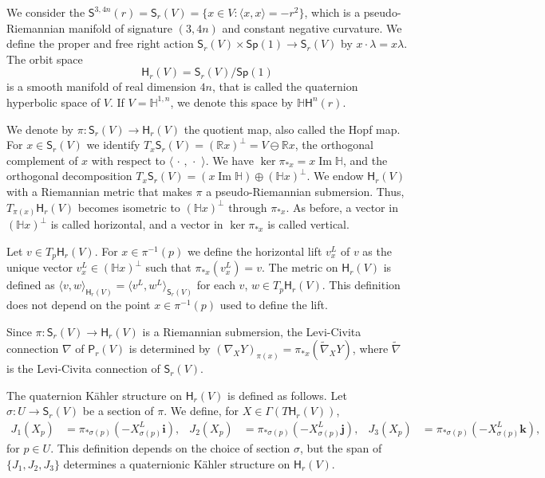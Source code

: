 \documentclass[12pt, a4paper]{amsart}
\newcommand{\R}{\mathbb{R}}
\renewcommand{\H}{\mathbb{H}}
\renewcommand{\Im}{\operatorname{Im}}
\newcommand{\Sp}{\mathsf{Sp}}
\theoremstyle{remark}
\begin{document}
We consider the $\mathsf{S}^{3,4n}(r)=\mathsf{S}_r(V)=\{{x}\in V:\langle {x},{x}\rangle=-r^2\}$,
which is a pseudo-Riemannian manifold of signature $(3,4n)$ and constant negative curvature.
We define the proper and free right action $\mathsf{S}_r(V)\times\Sp(1)\to\mathsf{S}_r(V)$ by ${x}\cdot \lambda={x}\lambda$.
The orbit space 
\[
\mathsf{H}_r(V)=\mathsf{S}_r(V)/\Sp(1)
\]
is a smooth manifold of real dimension $4n$, that is called the quaternion hyperbolic space of $V$.
If $V=\H^{1,n}$, we denote this space by $\H \mathsf{H}^n(r)$.

We denote by $\pi\colon\mathsf{S}_r(V)\to\mathsf{H}_r(V)$ the quotient map, also called the Hopf map.
For ${x}\in\mathsf{S}_r(V)$ we identify $T_{x}\mathsf{S}_r(V)=(\R{x})^\perp=V\ominus\R{x}$, the orthogonal complement of ${x}$ with respect to $\langle\,\cdot\,,\,\cdot\,\,\rangle$.
We have $\ker\pi_{*{x}}={x}\Im\H$, and the orthogonal decomposition $T_{x}\mathsf{S}_r(V)=({x}\Im\H)\oplus(\H{x})^\perp$.
We endow $\mathsf{H}_r(V)$ with a Riemannian metric that makes $\pi$ a pseudo-Riemannian submersion.
Thus, $T_{\pi({x})}\mathsf{H}_r(V)$ becomes isometric to $(\H{x})^\perp$ through $\pi_{*{x}}$.
As before, a vector in $(\H x)^\perp$ is called horizontal, and a vector in $\ker\pi_{*x}$ is called vertical.

Let $v\in T_{p}\mathsf{H}_r(V)$.
For ${x}\in\pi^{-1}(p)$ we define the horizontal lift $v^L_{x}$ of $v$ as the unique vector $v_x^L\in(\H{x})^\perp$ such that $\pi_{*{x}}(v^L_{x})=v$.
The metric on $\mathsf{H}_r(V)$ is defined as 
$\langle v,w\rangle_{\mathsf{H}_r(V)}=\langle v^L,w^L\rangle_{\mathsf{S}_r(V)}$ 
for each $v$, $w\in T_p\mathsf{H}_r(V)$.
This definition does not depend on the point ${x}\in\pi^{-1}(p)$ used to define the lift.

Since $\pi\colon\mathsf{S}_r(V)\to\mathsf{H}_r(V)$ is a Riemannian submersion, the Levi-Civita connection $\nabla$ of $\mathsf{P}_r(V)$ is determined by
$(\nabla_X Y)_{\pi(x)}=\pi_{*x}(\tilde{\nabla}_X Y)$,
where $\tilde{\nabla}$ is the Levi-Civita connection of $\mathsf{S}_r(V)$.

The quaternion K\"ahler structure on $\mathsf{H}_r(V)$ is defined as follows.
Let $\sigma\colon U\to\mathsf{S}_r(V)$ be a section of $\pi$.
We define, for $X\in\Gamma(T\mathsf{H}_r(V))$,
\[
\begin{aligned}
J_1(X_p)&{}=\pi_{*\sigma(p)}(-X_{\sigma(p)}^L\mathbf{i}),
&J_2(X_p)&{}=\pi_{*\sigma(p)}(-X_{\sigma(p)}^L\mathbf{j}),
&J_3(X_p)&{}=\pi_{*\sigma(p)}(-X_{\sigma(p)}^L\mathbf{k}),
\end{aligned}
\]
for $p\in U$.
This definition depends on the choice of section $\sigma$, but the span of $\{J_1,J_2,J_3\}$ determines a quaternionic K\"ahler structure on $\mathsf{H}_r(V)$.
\end{document}
